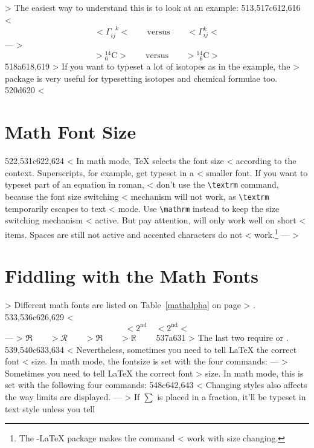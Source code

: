 \begin{example}
> The easiest way to understand this is to look at an example:
513,517c612,616
< \begin{displaymath} 
< \Gamma_{ij}^{\phantom{ij}k}
< \qquad \textrm{versus} \qquad
< \Gamma_{ij}^{k}
< \end{displaymath}  
---
> \begin{equation*}
> {}^{14}_{6}\text{C}
> \qquad \text{versus} \qquad
> {}^{14}_{\phantom{1}6}\text{C}
> \end{equation*}
518a618,619
> If you want to typeset a lot of isotopes as in the example, the 
> package is very useful for typesetting isotopes and chemical formulae too.
520d620
< \section{Math Font Size}
522,531c622,624
<  In math mode, \TeX{} selects the font size
< according to the context. Superscripts, for example, get typeset in a
< smaller font. If you want to typeset part of an equation in roman,
< don't use the \verb|\textrm| command, because the font size switching
< mechanism will not work, as \verb|\textrm| temporarily escapes to text
< mode. Use \verb|\mathrm| instead to keep the size switching mechanism
< active. But pay attention,  will only work well on short
< items. Spaces are still not active and accented characters do not
< work.\footnote{The \AmS-\LaTeX{} package makes the  command
<   work with size changing.}
---
> \section{Fiddling with the Math Fonts}\label{sec:fontsz}
> Different math fonts are listed on Table~\ref{mathalpha} on page
> \pageref{mathalpha}.
533,536c626,629
< \begin{equation}
< 2^{\textrm{nd}} \quad 
< 2^{\mathrm{nd}}
< \end{equation}
---
>  $\Re \qquad
>   \mathcal{R} \qquad
>   \mathfrak{R} \qquad
>   \mathbb{R} \qquad $  
537a631
> The last two require  or .
539,540c633,634
< Nevertheless, sometimes you need to tell \LaTeX{} the correct font
< size. In math mode, the fontsize is set with the four commands:
---
> Sometimes you need to tell \LaTeX{} the correct font
> size. In math mode, this is set with the following four commands:
548c642,643
< Changing styles also affects the way limits are displayed.
---
> If $\sum$ is placed in a fraction, it'll be typeset in text style unless you tell

\end{example}
